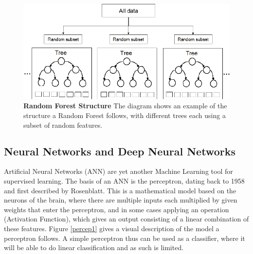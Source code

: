 \begin{figure}[!ht]
	\centerline{\includegraphics[width=5in]{images/background/rf.png}}
	\caption{{\bf Random Forest Structure\cite{rf}}
		The diagram shows an example of the structure a Random Forest follows, with different trees each using a subset of random features.} 
	\label{rf1}
\end{figure}

\clearpage
\subsection{Neural Networks and Deep Neural Networks}
\label{DNNs}
Artificial Neural Networks (ANN) are yet another Machine Learning tool for supervised learning. The basis of an ANN is the perceptron, dating back to 1958 and first described by Rosenblatt\cite{Rosenblatt58theperceptron:}. This is a mathematical model based on the neurons of the brain, where there are multiple inputs each multiplied by given weights that enter the perceptron, and in some cases applying an operation (Activation Function), which gives an output consisting of a linear combination of these features. Figure \ref{percep1} gives a visual description of the model a perceptron follows. A simple perceptron thus can be used as a classifier, where it will be able to do linear classification and as such is limited. 

